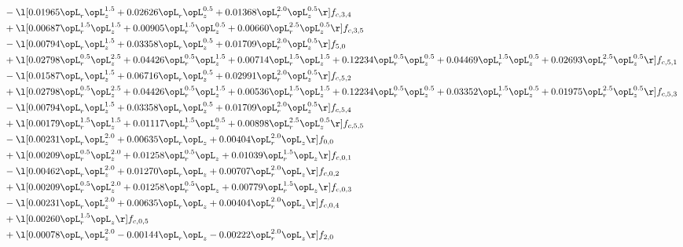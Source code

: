 \begin{alignat}{2}
& - \l[  0.01965 \opL_r \opL_z^{1.5} +  0.02626 \opL_r \opL_z^{0.5} +  0.01368 \opL_r^{2.0} \opL_z^{0.5}  \r] f_{c,3,4} \nonumber \\ 
& + \l[  0.00687 \opL_r^{1.5} \opL_z^{1.5} +  0.00905 \opL_r^{1.5} \opL_z^{0.5} +  0.00660 \opL_r^{2.5} \opL_z^{0.5}  \r] f_{c,3,5} \nonumber \\ 
& - \l[  0.00794 \opL_r \opL_z^{1.5} +  0.03358 \opL_r \opL_z^{0.5} +  0.01709 \opL_r^{2.0} \opL_z^{0.5}  \r] f_{5,0} \nonumber \\ 
& + \l[  0.02798 \opL_r^{0.5} \opL_z^{2.5} +  0.04426 \opL_r^{0.5} \opL_z^{1.5} +  0.00714 \opL_r^{1.5} \opL_z^{1.5} +  0.12234 \opL_r^{0.5} \opL_z^{0.5} +  0.04469 \opL_r^{1.5} \opL_z^{0.5} +  0.02693 \opL_r^{2.5} \opL_z^{0.5}  \r] f_{c,5,1} \nonumber \\ 
& - \l[  0.01587 \opL_r \opL_z^{1.5} +  0.06716 \opL_r \opL_z^{0.5} +  0.02991 \opL_r^{2.0} \opL_z^{0.5}  \r] f_{c,5,2} \nonumber \\ 
& + \l[  0.02798 \opL_r^{0.5} \opL_z^{2.5} +  0.04426 \opL_r^{0.5} \opL_z^{1.5} +  0.00536 \opL_r^{1.5} \opL_z^{1.5} +  0.12234 \opL_r^{0.5} \opL_z^{0.5} +  0.03352 \opL_r^{1.5} \opL_z^{0.5} +  0.01975 \opL_r^{2.5} \opL_z^{0.5}  \r] f_{c,5,3} \nonumber \\ 
& - \l[  0.00794 \opL_r \opL_z^{1.5} +  0.03358 \opL_r \opL_z^{0.5} +  0.01709 \opL_r^{2.0} \opL_z^{0.5}  \r] f_{c,5,4} \nonumber \\ 
& + \l[  0.00179 \opL_r^{1.5} \opL_z^{1.5} +  0.01117 \opL_r^{1.5} \opL_z^{0.5} +  0.00898 \opL_r^{2.5} \opL_z^{0.5}  \r] f_{c,5,5} \nonumber \\ 
& - \l[  0.00231 \opL_r \opL_z^{2.0} +  0.00635 \opL_r \opL_z +  0.00404 \opL_r^{2.0} \opL_z  \r] f_{0,0} \nonumber \\ 
& + \l[  0.00209 \opL_r^{0.5} \opL_z^{2.0} +  0.01258 \opL_r^{0.5} \opL_z +  0.01039 \opL_r^{1.5} \opL_z  \r] f_{c,0,1} \nonumber \\ 
& - \l[  0.00462 \opL_r \opL_z^{2.0} +  0.01270 \opL_r \opL_z +  0.00707 \opL_r^{2.0} \opL_z  \r] f_{c,0,2} \nonumber \\ 
& + \l[  0.00209 \opL_r^{0.5} \opL_z^{2.0} +  0.01258 \opL_r^{0.5} \opL_z +  0.00779 \opL_r^{1.5} \opL_z  \r] f_{c,0,3} \nonumber \\ 
& - \l[  0.00231 \opL_r \opL_z^{2.0} +  0.00635 \opL_r \opL_z +  0.00404 \opL_r^{2.0} \opL_z  \r] f_{c,0,4} \nonumber \\ 
& + \l[  0.00260 \opL_r^{1.5} \opL_z  \r] f_{c,0,5} \nonumber \\ 
& + \l[  0.00078 \opL_r \opL_z^{2.0}   -0.00144 \opL_r \opL_z   -0.00222 \opL_r^{2.0} \opL_z  \r] f_{2,0} \nonumber \\ 

\end{alignat}

